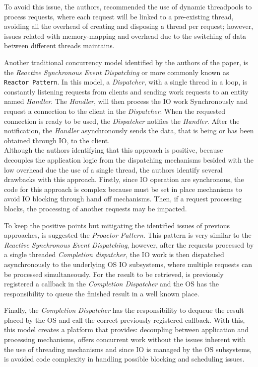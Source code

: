 To avoid this issue, the authors, recommended the use of dynamic threadpools to process requests, where each request will be linked to a pre-existing thread, avoiding all the overhead of creating and disposing a thread per request;
however, issues related with memory-mapping and overhead due to the switching of data between different threads maintains. 

Another traditional concurrency model identified by the authors of the paper, is the \textit{Reactive Synchronous Event Dispatching} or more commonly known as \texttt{Reactor Pattern}. In this model, a \textit{Dispatcher}, with a single thread in a loop, is constantly listening requests from clients and sending work requests to an entity named \textit{Handler}. 
The \textit{Handler}, will then process the IO work Synchronously and request a connection to the client in the \textit{Dispatcher}. When the requested connection is ready to be used, the \textit{Dispatcher} notifies the \textit{Handler}. After the notification, the \textit{Handler} asynchronously sends the data, that is being or has been obtained through IO, to the client.\\
Although the authors identifying that this approach is positive, because decouples the application logic from the dispatching mechanisms besided with the low overhead due the use of a single thread, the authors identify several drawbacks with this approach. 
Firstly, since IO operation are synchronous, the code for this approach is complex because must be set in place mechanisms to avoid IO blocking through hand off mechanisms. 
Then, if a request processing blocks, the processing of another requests may be impacted. 

To keep the positive points but mitigating the identified issues of previous approaches, is suggested the \textit{Proactor Pattern}. 
This pattern is very similar to the \textit{Reactive Synchronous Event Dispatching}, however, after the requests processed by a single threaded \textit{Completion dispatcher}, 
the IO work is then dispatched asynchronously to the underlying OS IO subsystems, where multiple requests can be processed simultaneously. 
For the result to be retrieved, is previously registered a callback in the \textit{Completion Dispatcher} and the OS has the responsibility to queue the finished result in a well known place. 

Finally, the \textit{Completion Dispatcher} has the responsibility to dequeue the result placed by the OS and call the correct previously registered callback. 
With this, this model creates a platform that provides: decoupling between application and processing mechanisms,
offers concurrent work without the issues inherent with the use of threading mechanisms and since IO is managed by the OS subsystems, is avoided code complexity in handling possible blocking and scheduling issues.  

